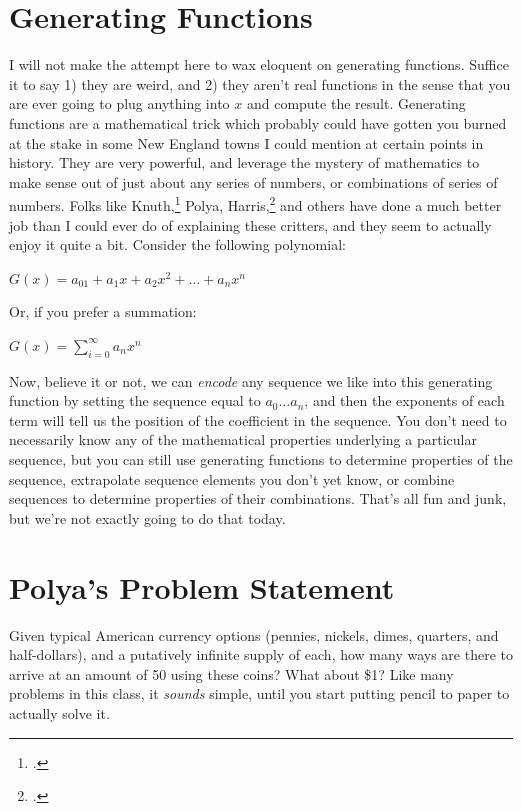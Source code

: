 \section{Generating Functions}
I will not make the attempt here to wax eloquent on generating functions.  Suffice it to say 1) they are weird, and 2) they aren't real functions in the sense that you are ever going to plug anything into $x$ and compute the result.  Generating functions are a mathematical trick which probably could have gotten you burned at the stake in some New England towns I could mention at certain points in history.  They are very powerful, and leverage the mystery of mathematics to make sense out of just about any series of numbers, or combinations of series of numbers.  Folks like Knuth,\footcite{concrete} Polya, Harris,\footcite{harris} and others have done a much better job than I could ever do of explaining these critters, and they seem to actually enjoy it quite a bit.  Consider the following polynomial:
\begin{center}
$G(x) = a_01 + a_1x + a_2x^2 + \ldots + a_nx^n$
\end{center}
Or, if you prefer a summation:
\begin{center}
$G(x) = \sum_{i=0}^{\infty} a_nx^n$
\end{center}
Now, believe it or not, we can \textit{encode} any sequence we like into this generating function by setting the sequence equal to $a_0 ... a_n$, and then the exponents of each term will tell us the position of the coefficient in the sequence.  You don't need to necessarily know any of the mathematical properties underlying a particular sequence, but you can still use generating functions to determine properties of the sequence, extrapolate sequence elements you don't yet know, or combine sequences to determine properties of their combinations.  That's all fun and junk, but we're not exactly going to do that today.

\ifdefined\embedversion\newpage\fi
\section{Polya's Problem Statement}
Given typical American currency options (pennies, nickels, dimes, quarters, and half-dollars), and a putatively infinite supply of each, how many ways are there to arrive at an amount of 50\textcent \,\,using these coins?  What about \$1?  Like many problems in this class, it \textit{sounds} simple, until you start putting pencil to paper to actually solve it.

